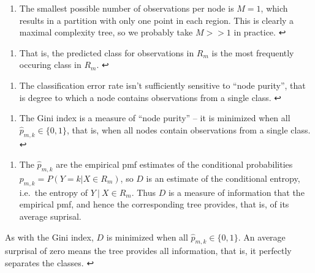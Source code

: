 \documentclass[11pt]{article}
\providecommand{\tightlist}{%
      \setlength{\itemsep}{0pt}\setlength{\parskip}{0pt}}
\begin{document}
\hypertarget{foot69}{}
\begin{enumerate}
\def\labelenumi{\arabic{enumi}.}
\setcounter{enumi}{68}
\tightlist
\item
  The smallest possible number of observations per node is \(M=1\),
  which results in a partition with only one point in each region. This
  is clearly a maximal complexity tree, so we probably take \(M >> 1\)
  in practice. ↩
\end{enumerate}

\hypertarget{foot70}{}
\begin{enumerate}
\def\labelenumi{\arabic{enumi}.}
\setcounter{enumi}{69}
\tightlist
\item
  That is, the predicted class for observations in \(R_m\) is the most
  frequently occuring class in \(R_m\). ↩
\end{enumerate}

\hypertarget{foot71}{}
\begin{enumerate}
\def\labelenumi{\arabic{enumi}.}
\setcounter{enumi}{70}
\tightlist
\item
  The classification error rate isn't sufficiently sensitive to ``node
  purity'', that is degree to which a node contains observations from a
  single class. ↩
\end{enumerate}

\hypertarget{foot72}{}
\begin{enumerate}
\def\labelenumi{\arabic{enumi}.}
\setcounter{enumi}{71}
\tightlist
\item
  The Gini index is a measure of ``node purity'' -- it is minimized when
  all \(\hat{p}_{m, k} \in \{0, 1\}\), that is, when all nodes contain
  observations from a single class. ↩
\end{enumerate}

\hypertarget{foot73}{}
\begin{enumerate}
\def\labelenumi{\arabic{enumi}.}
\setcounter{enumi}{72}
\tightlist
\item
  The \(\hat{p}_{m,k}\) are the empirical pmf estimates of the
  conditional probabilities \(p_{m, k} = P(Y = k | X \in R_m)\), so
  \(D\) is an estimate of the conditional entropy, i.e.~the entropy of
  \(Y\ |\ X \in R_m\). Thus \(D\) is a measure of information that the
  empirical pmf, and hence the corresponding tree provides, that is, of
  its average suprisal.
\end{enumerate}

As with the Gini index, \(D\) is minimized when all
\(\hat{p}_{m, k} \in \{0, 1\}\). An average surprisal of zero means the
tree provides all information, that is, it perfectly separates the
classes. ↩
\end{document}
